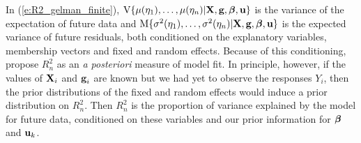 \documentclass[12pt]{article}
\begin{document}
In (\ref{e:R2_gelman_finite}), $\mbox{V}\{\mu(\eta_1),\dots,\mu(\eta_n)|\mbox{\bf X},\mbox{\bf g},\mbox{\boldmath $\beta$},\mbox{\bf u}\}$ is the variance of the expectation of future data and $\mbox{M}\{\sigma^2(\eta_1),\dots,\sigma^2(\eta_n)|\mbox{\bf X},\mbox{\bf g},\mbox{\boldmath $\beta$},\mbox{\bf u}\}$ is the expected variance of future residuals, both conditioned on the explanatory variables, membership vectors and fixed and random effects. Because of this conditioning, \cite{gelmanf2019r} propose $R^2_n$ as an {\it a posteriori} measure of model fit. In principle, however, if the values of $\mbox{\bf X}_i$ and $\mbox{\bf g}_{i}$ are known but we had yet to observe the responses $Y_i$, then the prior distributions of the fixed and random effects would induce a prior distribution on $R^2_n$.
Then $R^2_n$ is the proportion of variance explained by the model for future data, conditioned on these variables and our prior information for $\mbox{\boldmath $\beta$}$ and $\mbox{\bf u}_k$.
\end{document}
